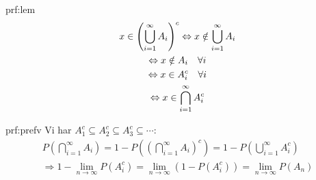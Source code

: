 \par\bigskip
\begin{prf}{prf:lem}
  \begin{equation*}
    \begin{gathered}
      x\in\left(\bigcup_{i=1}^{\infty}A_i\right)^c\Leftrightarrow x\notin \bigcup_{i=1}^{\infty}A_i\\
      \Leftrightarrow x\notin A_i\quad \forall i\\
      \Leftrightarrow x\in A_i^c\quad\forall i\\
      \Leftrightarrow x\in\bigcap_{i=1}^{\infty}A_i^c
    \end{gathered}
  \end{equation*}
\end{prf}
\par\bigskip
\begin{prf}{prf:prefv}
  Vi har $A_1^c\subseteq A_2^c\subseteq A_3^c\subseteq\cdots$:
  \begin{equation*}
    \begin{gathered}
      P\left(\bigcap_{i=1}^{\infty}A_i\right) = 1-P\left(\left(\bigcap_{i=1}^{\infty}A_i\right)^c\right) = 1-P\left(\bigcup_{i=1}^{\infty}A_i^c\right)\\
      \Rightarrow 1-\lim_{n\to\infty}P(A_i^c) = \lim_{n\to\infty}(1-P(A_i^c)) = \lim_{n\to\infty}P(A_n)
    \end{gathered}
  \end{equation*}
\end{prf}
\newpage
